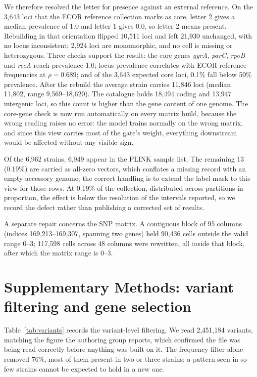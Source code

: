 \documentclass[11pt]{article}
\begin{document}
We therefore resolved the letter for presence against an external reference. On the 3,643 loci that
the ECOR reference collection marks as core, letter 2 gives a median prevalence of 1.0 and letter 1
gives 0.0, so letter 2 means present. Rebuilding in that orientation flipped 10,511 loci and left
21,930 unchanged, with no locus inconsistent; 2,924 loci are monomorphic, and no cell is missing or
heterozygous. Three checks support the result: the core genes \textit{gyrA}, \textit{parC},
\textit{rpoB} and \textit{recA} reach prevalence 1.0; locus prevalence correlates with ECOR reference
frequencies at $\rho = 0.689$; and of the 3,643 expected core loci, 0.1\% fall below 50\% prevalence.
After the rebuild the average strain carries 11,846 loci (median 11,802, range 9,569--18,620). The
catalogue holds 18,494 coding and 13,947 intergenic loci, so this count is higher than the gene
content of one genome. The core-gene check is now run automatically on every matrix build, because the wrong
reading raises no error: the model trains normally on the wrong matrix, and since this view carries
most of the gate's weight, everything downstream would be affected without any visible sign.

Of the 6,962 strains, 6,949 appear in the PLINK sample list. The remaining 13 (0.19\%) are carried
as all-zero vectors, which conflates a missing record with an empty accessory genome; the correct
handling is to extend the label mask to this view for those rows. At 0.19\% of the collection,
distributed across partitions in proportion, the effect is below the resolution of the intervals
reported, so we record the defect rather than publishing a corrected set of results.

A separate repair concerns the SNP matrix. A contiguous block of 95 columns (indices
169,213--169,307, spanning two genes) held 90,436 cells outside the valid range 0--3; 117,598 cells
across 48 columns were rewritten, all inside that block, after which the matrix range is 0--3.

\section{Supplementary Methods: variant filtering and gene selection}

Table~\ref{tab:variants} records the variant-level filtering. We read 2,451,184 variants, matching
the figure the authoring group reports, which confirmed the file was being read correctly before
anything was built on it. The frequency filter alone removed 76\%, most of them present in two or
three strains; a pattern seen in so few strains cannot be expected to hold in a new one.
\end{document}
